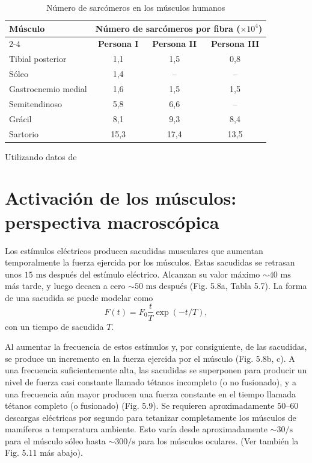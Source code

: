 \documentclass[12pt]{book}
\begin{document}
\begin{table}[htbp]
\centering
\caption{Número de sarcómeros en los músculos humanos}
\label{tab:56}
\begin{tabularx}{\textwidth}{Xccc}
\toprule
\textbf{Músculo} & \multicolumn{3}{c}{\textbf{Número de sarcómeros por fibra ($\times 10^4$)}} \\
\cmidrule(lr){2-4}
 & \textbf{Persona I} & \textbf{Persona II} & \textbf{Persona III} \\
\midrule
Tibial posterior & 1,1 & 1,5 & 0,8 \\
Sóleo & 1,4 & -- & -- \\
Gastrocnemio medial & 1,6 & 1,5 & 1,5 \\
Semitendinoso & 5,8 & 6,6 & -- \\
Grácil & 8,1 & 9,3 & 8,4 \\
Sartorio & 15,3 & 17,4 & 13,5 \\
\bottomrule
\end{tabularx}
\begin{flushleft}
    \small Utilizando datos de \cite{52}
\end{flushleft}
\end{table}

\section{Activación de los músculos: perspectiva macroscópica}

Los estímulos eléctricos producen sacudidas musculares que aumentan temporalmente la fuerza ejercida por los músculos. Estas sacudidas se retrasan unos $15\text{ ms}$ después del estímulo eléctrico. Alcanzan su valor máximo $\sim 40\text{ ms}$ más tarde, y luego decaen a cero $\sim 50\text{ ms}$ después (Fig. 5.8a, Tabla 5.7). La forma de una sacudida se puede modelar como
\begin{equation}
F(t) = F_0 \frac{t}{T} \exp(-t/T),
\label{eq:5.1}
\end{equation}
con un tiempo de sacudida $T$.

Al aumentar la frecuencia de estos estímulos y, por consiguiente, de las sacudidas, se produce un incremento en la fuerza ejercida por el músculo (Fig. 5.8b, c). A una frecuencia suficientemente alta, las sacudidas se superponen para producir un nivel de fuerza casi constante llamado tétanos incompleto (o no fusionado), y a una frecuencia aún mayor producen una fuerza constante en el tiempo llamada tétanos completo (o fusionado) (Fig. 5.9). Se requieren aproximadamente $50\text{--}60$ descargas eléctricas por segundo para tetanizar completamente los músculos de mamíferos a temperatura ambiente. Esto varía desde aproximadamente $\sim 30/\text{s}$ para el músculo sóleo hasta $\sim 300/\text{s}$ para los músculos oculares. (Ver también la Fig. 5.11 más abajo).
\end{document}
